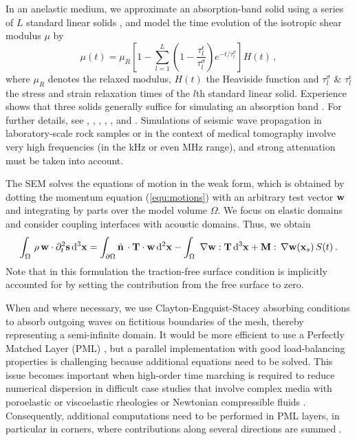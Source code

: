\documentclass[referee,extra]{gji}
\newcommand{\bequ}{\begin{equation} }
\newcommand{\eequ}{\end{equation} }
\newcommand{\intOmega}{\int_\Omega \, }
\newcommand{\intSurface}{\int_{\partial \Omega}}
\newcommand{\bnabla}{ \, {\bf \nabla } }
\newcommand{\bs}{ {\bf s } }
\newcommand{\bT}{ {\bf T } }
\newcommand{\bM}{ {\bf M } }
\newcommand{\bx}{ {\bf x } }
\newcommand{\bw}{ {\bf w } }
\newcommand{\bnormal}{ \hat{ \bf{n} } \, }
\renewcommand{\cite}[1]{\citet{#1}}
\begin{document}
In an anelastic medium,
we approximate an absorption-band solid using a series of $L$ standard linear solids
\citep{LiAnKa76},
and model the time evolution of the isotropic shear modulus $\mu$ by
\bequ
\mu (t) = \mu_R \left[ 1 - \sum_{l=1}^L \left( 1 - \frac{\tau_l^\epsilon}{\tau_l^\sigma}  \right) e^{-t/\tau_l^\sigma} \right] H(t) \, ,
\eequ
where $\mu_R$ denotes the relaxed modulus, $H(t)$ the Heaviside function and $\tau_l^\sigma$ \& $\tau_l^\epsilon$
 the stress and strain relaxation times of the $l$th standard linear solid.
Experience shows that three solids generally suffice for simulating an absorption band
\citep{EmKo87}.
For further details, see \cite{CaKoKo88b}, \cite{Rob96}, \cite{DaBr01}, \cite{MoKr05}, \cite{KoTsTr05}, \cite{Car07} and \cite{SaKoTr10}.
Simulations of seismic wave propagation in laboratory-scale rock samples or in the context of medical tomography
involve very high frequencies (in the kHz or even MHz range), and strong attenuation must be taken into account.

The SEM solves the equations of motion in the weak form,
which is obtained by dotting the momentum equation (\ref{equ:motions}) with an arbitrary test vector $\bw$ and integrating by parts over the model volume $\Omega$.
We focus on elastic domains and consider coupling interfaces with acoustic domains. Thus, we obtain
\bequ
\intOmega \rho \,\bw \cdot \partial_t^2 \bs \, \mathrm{d}^3\bx =
\intSurface  \bnormal  \cdot \bT\cdot \bw \,\mathrm{d}^2\bx
\mbox{}- \intOmega \bnabla \bw : \bT \,\mathrm{d}^3\bx + \bM : \bnabla \bw( \bx_s ) \,S(t) \, .
\eequ
Note that in this formulation the traction-free surface condition is implicitly accounted for by setting the
contribution from the free surface to zero.

When and where necessary, we use Clayton-Engquist-Stacey absorbing conditions \citep{ClEn77,Sta88,QuTaZa98} to absorb outgoing waves on  fictitious boundaries of the mesh, thereby representing a semi-infinite domain.
It would be more efficient to use a Perfectly Matched Layer (PML) \citep[see e.g.,][]{KoMa07,MaKoGe08,MaKo09},
but a parallel implementation with good load-balancing properties is challenging because additional equations need to be solved.
This issue becomes important when high-order time marching is required to reduce numerical dispersion in difficult case studies that involve complex media with poroelastic or viscoelastic rheologies \citep{MaKoEz08,MaKoGeBr10} or Newtonian compressible fluids \citep{MaCo2010}. Consequently, additional computations need to be performed in PML layers, in particular in corners,
where contributions along several directions are summed \citep{KoMa07}.
\end{document}

